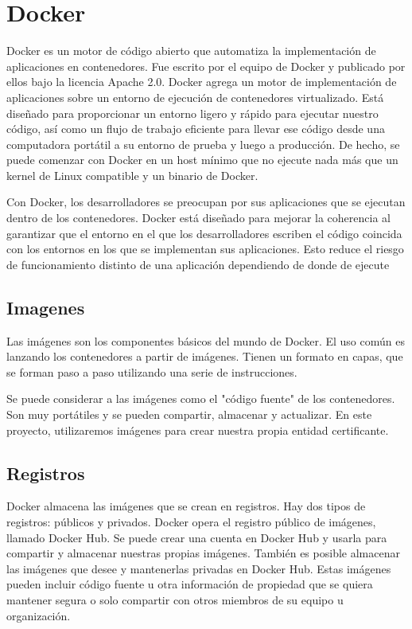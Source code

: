 \section{Docker}

Docker es un motor de código abierto que automatiza la implementación de aplicaciones 
en contenedores. Fue escrito por el equipo de Docker y publicado por ellos bajo la 
licencia Apache 2.0. Docker agrega un motor de implementación de aplicaciones sobre 
un entorno de ejecución de contenedores virtualizado. Está diseñado para proporcionar 
un entorno ligero y rápido para ejecutar nuestro código, así como un flujo de trabajo 
eficiente para llevar ese código desde una computadora portátil a su entorno de prueba 
y luego a producción. De hecho, se puede comenzar con Docker en un host mínimo que 
no ejecute nada más que un kernel de Linux compatible y un binario de Docker.

Con Docker, los desarrolladores se preocupan por sus aplicaciones que se ejecutan 
dentro de los contenedores. Docker está diseñado para mejorar la coherencia al 
garantizar que el entorno en el que los desarrolladores escriben el código coincida 
con los entornos en los que se implementan sus aplicaciones. Esto reduce el riesgo 
de funcionamiento distinto de una aplicación dependiendo de donde de ejecute


\subsection{Imagenes}
Las imágenes son los componentes básicos del mundo de Docker. El uso común es 
lanzando los contenedores a partir de imágenes. Tienen un formato en capas, que 
se forman paso a paso utilizando una serie de instrucciones.

Se puede considerar a las imágenes como el "código fuente" de los contenedores. 
Son muy portátiles y se pueden compartir, almacenar y actualizar. En este proyecto, 
utilizaremos imágenes para crear nuestra propia entidad certificante.

\subsection{Registros}
Docker almacena las imágenes que se crean en registros. Hay dos tipos de 
registros: públicos y privados. Docker opera el registro público de imágenes, 
llamado Docker Hub. Se puede crear una cuenta en Docker Hub y usarla para 
compartir y almacenar nuestras propias imágenes. También es posible almacenar 
las imágenes que desee y mantenerlas privadas en Docker Hub. Estas imágenes 
pueden incluir código fuente u otra información de propiedad que se quiera 
mantener segura o solo compartir con otros miembros de su equipo u organización.

